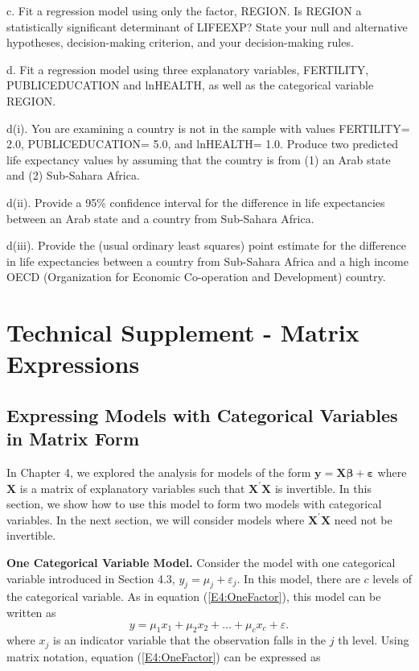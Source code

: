 \begin{exercises}
c. Fit a regression model using only the factor, REGION. Is REGION a
statistically significant determinant of LIFEEXP? State your null
and alternative hypotheses, decision-making criterion, and your
decision-making rules.

d. Fit a regression model using three explanatory variables,
FERTILITY, PUBLICEDUCATION and lnHEALTH, as well as the categorical
variable REGION.

d(i). You are examining a country is not in the sample with values
FERTILITY= 2.0, PUBLICEDUCATION= 5.0,  and lnHEALTH= 1.0. Produce
two predicted life expectancy values by assuming that the country is
from (1) an Arab state and (2) Sub-Sahara Africa.

d(ii). Provide a 95\% confidence interval for the difference in life
expectancies between an Arab state and a country from Sub-Sahara
Africa.

d(iii). Provide the (usual ordinary least squares) point estimate
for the difference in life expectancies between a country from
Sub-Sahara Africa and a high income OECD (Organization for Economic
Co-operation and Development) country.

\end{exercises}

\section{Technical Supplement - Matrix Expressions}

\subsection{Expressing Models with Categorical Variables in
Matrix Form}

In Chapter 4, we explored the analysis for models of the form
$\mathbf{y=X}  \boldsymbol \beta + \boldsymbol \varepsilon$ where
$\mathbf{X}$ is a matrix of explanatory variables such that
$\mathbf{X}^{\prime}\mathbf{X}$ is invertible. In this section, we
show how to use this model to form two models with categorical
variables. In the next section, we will consider models where
$\mathbf{X}^{\prime}\mathbf{X}$ need not be invertible.

\textbf{One Categorical Variable Model.} Consider the model with one
categorical variable introduced in Section 4.3, $y_{j}=\mu_{j} +
\varepsilon_{j}.$ In this model, there are $c$ levels of the
categorical variable. As in equation (\ref{E4:OneFactor}), this
model can be written as
\begin{equation*}
y=\mu_1x_1+\mu_2x_2+\ldots +\mu_cx_{c}+\varepsilon.
\end{equation*}
where $x_{j}$ is an indicator variable that the observation falls in the $j$%
th level. Using matrix notation, equation (\ref{E4:OneFactor}) can
be expressed as


